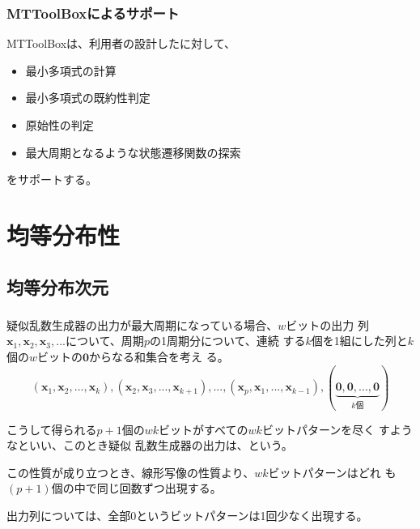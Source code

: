 \documentclass[cjk, dvips, handout, trans, xcolor=dvipsnames, hyperref={bookmarks=false}]{beamer}
\def\bx{{{\mathbf x}}}
\begin{document}
\begin{frame}[t]
  \frametitle{MTToolBoxによるサポート}
  MTToolBoxは、利用者の設計した\FLPRNG に対して、
  \begin{itemize}
  \item 最小多項式の計算
  \item 最小多項式の既約性判定
  \item 原始性の判定
  \item 最大周期となるような状態遷移関数の探索
  \end{itemize}
  をサポートする。
\end{frame}

\section{均等分布性}
\subsection{均等分布次元}
\begin{frame}[t]
  \frametitle{\insertsubsection}

  疑似乱数生成器の出力が最大周期になっている場合、$w$ビットの出力
  列$\bx_1, \bx_2, \bx_3, ...$について、周期$p$の1周期分について、連続
  する$k$個を1組にした列と$k$個の$w$ビットの$\mathbf{0}$からなる和集合を考え
  る。
  \[
  (\bx_1, \bx_2, ..., \bx_k), (\bx_2, \bx_3, ..., \bx_{k+1}), ...,
  (\bx_{p}, \bx_{1}, ..., \bx_{k-1}), (\underbrace{\mathbf{0},
    \mathbf{0}, ..., \mathbf{0}}_{k\text{個}})
  \]

  \pause
  こうして得られる$p+1$個の$wk$ビットがすべての$wk$ビットパターンを尽く
  すようなといい、このとき疑似
  乱数生成器の出力は、という。

  \pause
  \vspace{\baselineskip}
  この性質が成り立つとき、線形写像の性質より、$wk$ビットパターンはどれ
  も$(p+1)$個の中で同じ回数ずつ出現する。

  出力列については、全部$0$というビットパターンは1回少なく出現する。
\end{frame}
\end{document}

